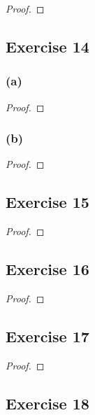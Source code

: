 \documentclass[14pt]{extarticle}
\begin{document}
\begin{proof}

\end{proof}

\subsection{Exercise 14}

\subsubsection{(a)}

\begin{proof}

\end{proof}

\subsubsection{(b)}

\begin{proof}

\end{proof}

\subsection{Exercise 15}

\begin{proof}

\end{proof}

\subsection{Exercise 16}

\begin{proof}

\end{proof}

\subsection{Exercise 17}

\begin{proof}

\end{proof}

\subsection{Exercise 18}
\end{document}

